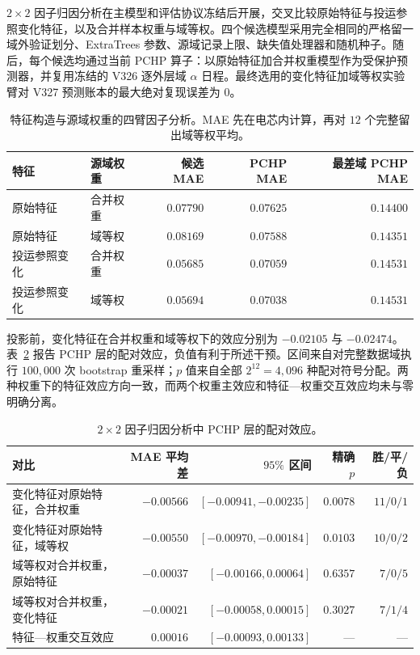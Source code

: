 \documentclass[UTF8,11pt]{ctexart}
\begin{document}
$2\times2$ 因子归因分析在主模型和评估协议冻结后开展，交叉比较原始特征与投运参照变化特征，以及合并样本权重与域等权。四个候选模型采用完全相同的严格留一域外验证划分、ExtraTrees 参数、源域记录上限、缺失值处理器和随机种子。随后，每个候选均通过当前 PCHP 算子：以原始特征加合并权重模型作为受保护预测器，并复用冻结的 V326 逐外层域 $\alpha$ 日程。最终选用的变化特征加域等权实验臂对 V327 预测账本的最大绝对复现误差为 $0$。

\begin{table}[H]
\centering
\caption{特征构造与源域权重的四臂因子分析。MAE 先在电芯内计算，再对 $12$ 个完整留出域等权平均。}
\label{tab:factorial_arms_zh}
\begin{tabularx}{\textwidth}{>{\raggedright\arraybackslash}X>{\raggedright\arraybackslash}Xrrr}
\toprule
特征 & 源域权重 & 候选 MAE & PCHP MAE & 最差域 PCHP MAE \\
\midrule
原始特征 & 合并权重 & $0.07790$ & $0.07625$ & $0.14400$ \\
原始特征 & 域等权 & $0.08169$ & $0.07588$ & $0.14351$ \\
投运参照变化 & 合并权重 & $0.05685$ & $0.07059$ & $0.14531$ \\
投运参照变化 & 域等权 & $0.05694$ & $0.07038$ & $0.14531$ \\
\bottomrule
\end{tabularx}
\end{table}

投影前，变化特征在合并权重和域等权下的效应分别为 $-0.02105$ 与 $-0.02474$。表~\ref{tab:factorial_effects_zh} 报告 PCHP 层的配对效应，负值有利于所述干预。区间来自对完整数据域执行 $100{,}000$ 次 bootstrap 重采样；$p$ 值来自全部 $2^{12}=4{,}096$ 种配对符号分配。两种权重下的特征效应方向一致，而两个权重主效应和特征—权重交互效应均未与零明确分离。

\begin{table}[H]
\centering
\caption{$2\times2$ 因子归因分析中 PCHP 层的配对效应。}
\label{tab:factorial_effects_zh}
\scriptsize
\begin{tabularx}{\textwidth}{>{\raggedright\arraybackslash}Xrrrr}
\toprule
对比 & MAE 平均差 & $95\%$ 区间 & 精确 $p$ & 胜/平/负 \\
\midrule
变化特征对原始特征，合并权重 & $-0.00566$ & $[-0.00941,-0.00235]$ & $0.0078$ & $11/0/1$ \\
变化特征对原始特征，域等权 & $-0.00550$ & $[-0.00970,-0.00184]$ & $0.0103$ & $10/0/2$ \\
域等权对合并权重，原始特征 & $-0.00037$ & $[-0.00166,0.00064]$ & $0.6357$ & $7/0/5$ \\
域等权对合并权重，变化特征 & $-0.00021$ & $[-0.00058,0.00015]$ & $0.3027$ & $7/1/4$ \\
特征—权重交互效应 & $0.00016$ & $[-0.00093,0.00133]$ & --- & --- \\
\bottomrule
\end{tabularx}
\end{table}
\end{document}
